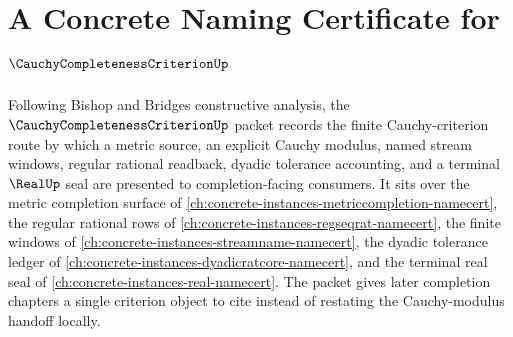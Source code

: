\chapter{A Concrete Naming Certificate for $\CauchyCompletenessCriterionUp$}
\label{ch:concrete-instances-cauchy-completeness-criterion-namecert}

Following Bishop and Bridges constructive analysis, the $\CauchyCompletenessCriterionUp$ packet records the finite Cauchy-criterion route by which a metric source, an explicit Cauchy modulus, named stream windows, regular rational readback, dyadic tolerance accounting, and a terminal $\RealUp$ seal are presented to completion-facing consumers. It sits over the metric completion surface of \autoref{ch:concrete-instances-metriccompletion-namecert}, the regular rational rows of \autoref{ch:concrete-instances-regseqrat-namecert}, the finite windows of \autoref{ch:concrete-instances-streamname-namecert}, the dyadic tolerance ledger of \autoref{ch:concrete-instances-dyadicratcore-namecert}, and the terminal real seal of \autoref{ch:concrete-instances-real-namecert}. The packet gives later completion chapters a single criterion object to cite instead of restating the Cauchy-modulus handoff locally.

